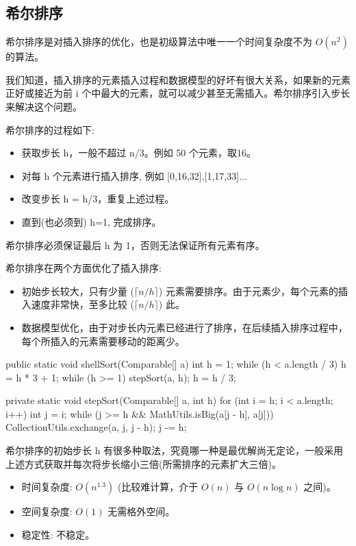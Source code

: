 \subsection{希尔排序}

希尔排序是对插入排序的优化，也是初级算法中唯一一个时间复杂度不为 $O(n^2)$ 的算法。

我们知道，插入排序的元素插入过程和数据模型的好坏有很大关系，如果新的元素正好或接近为前 i 个中最大的元素，就可以减少甚至无需插入。希尔排序引入步长来解决这个问题。

希尔排序的过程如下:
\begin{itemize}
  \item 获取步长 h，一般不超过 n/3。例如 50 个元素，取16。
  \item 对每 h 个元素进行插入排序, 例如 [0,16,32],[1,17,33]... 
  \item 改变步长 h = h/3，重复上述过程。
  \item 直到(也必须到) h=1, 完成排序。
\end{itemize}

希尔排序必须保证最后 h 为 1，否则无法保证所有元素有序。

希尔排序在两个方面优化了插入排序:
\begin{itemize}
  \item 初始步长较大，只有少量 ($\lceil n/h \rceil$) 元素需要排序。由于元素少，每个元素的插入速度非常快，至多比较 ($\lceil n/h \rceil$) 此。
  \item 数据模型优化，由于对步长内元素已经进行了排序，在后续插入排序过程中，每个所插入的元素需要移动的距离少。
\end{itemize}

\begin{Java}
public static void shellSort(Comparable[] a) {
    int h = 1;
    while (h < a.length / 3) h = h * 3 + 1;
    while (h >= 1) {
        stepSort(a, h);
        h = h / 3;
    }
}

private static void stepSort(Comparable[] a, int h) {
    for (int i = h; i < a.length; i++) {
        int j = i;
        while (j >= h && MathUtils.isBig(a[j - h], a[j])) {
            CollectionUtils.exchange(a, j, j - h);
            j -= h;
        }
    }
}
\end{Java}

希尔排序的初始步长 h 有很多种取法，究竟哪一种是最优解尚无定论，一般采用上述方式获取并每次将步长缩小三倍(所需排序的元素扩大三倍)。

\begin{itemize}
  \item 时间复杂度: $O(n^{1.3})$ (比较难计算，介于 $O(n)$ 与 $O(n\log n)$ 之间)。
  \item 空间复杂度: $O(1)$ 无需格外空间。
  \item 稳定性: 不稳定。
\end{itemize}